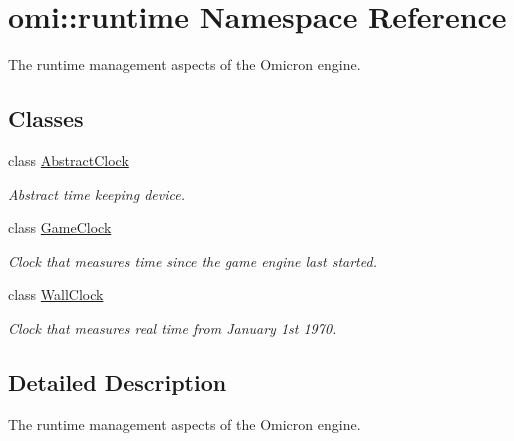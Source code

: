 \hypertarget{namespaceomi_1_1runtime}{}\section{omi\+:\+:runtime Namespace Reference}
\label{namespaceomi_1_1runtime}


The runtime management aspects of the Omicron engine.  


\subsection*{Classes}
\begin{DoxyCompactItemize}
\item 
class \hyperlink{classomi_1_1runtime_1_1_abstract_clock}{Abstract\+Clock}
\begin{DoxyCompactList}\small\item\em Abstract time keeping device. \end{DoxyCompactList}\item 
class \hyperlink{classomi_1_1runtime_1_1_game_clock}{Game\+Clock}
\begin{DoxyCompactList}\small\item\em Clock that measures time since the game engine last started. \end{DoxyCompactList}\item 
class \hyperlink{classomi_1_1runtime_1_1_wall_clock}{Wall\+Clock}
\begin{DoxyCompactList}\small\item\em Clock that measures real time from January 1st 1970. \end{DoxyCompactList}\end{DoxyCompactItemize}


\subsection{Detailed Description}
The runtime management aspects of the Omicron engine. 